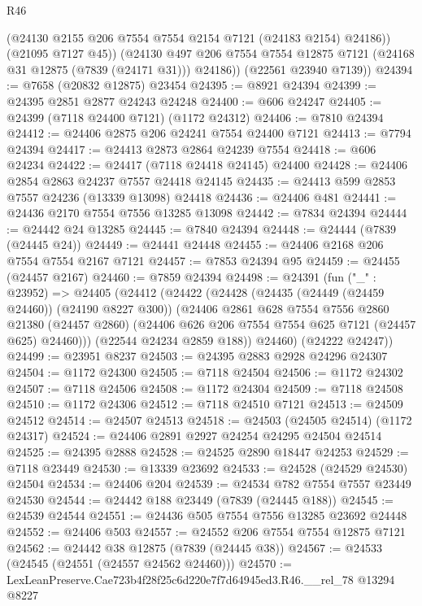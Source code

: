 \begin{lexlean}{R46}
\begin{coremodule}
            (@24130 @2155 @206 @7554 @7554 @2154 @7121 (@24183 @2154) @24186))
          (@21095 @7127 @45))
        (@24130 @497 @206 @7554 @7554 @12875 @7121 (@24168 @31 @12875 (@7839 (@24171 @31))) @24186))
      (@22561 @23940 @7139))
@24394 := @7658 (@20832 @12875) @23454
@24395 := @8921 @24394
@24399 := @24395 @2851 @2877 @24243 @24248
@24400 := @606 @24247
@24405 := @24399 (@7118 @24400 @7121) (@1172 @24312)
@24406 := @7810 @24394
@24412 := @24406 @2875 @206 @24241 @7554 @24400 @7121
@24413 := @7794 @24394
@24417 := @24413 @2873 @2864 @24239 @7554
@24418 := @606 @24234
@24422 := @24417 (@7118 @24418 @24145) @24400
@24428 := @24406 @2854 @2863 @24237 @7557 @24418 @24145
@24435 := @24413 @599 @2853 @7557 @24236 (@13339 @13098) @24418
@24436 := @24406 @481
@24441 := @24436 @2170 @7554 @7556 @13285 @13098
@24442 := @7834 @24394
@24444 := @24442 @24 @13285
@24445 := @7840 @24394
@24448 := @24444 (@7839 (@24445 @24))
@24449 := @24441 @24448
@24455 := @24406 @2168 @206 @7554 @7554 @2167 @7121
@24457 := @7853 @24394 @95
@24459 := @24455 (@24457 @2167)
@24460 := @7859 @24394
@24498 := @24391
    (fun ("_" : @23952) =>
    @24405
      (@24412
        (@24422
          (@24428
            (@24435 (@24449 (@24459 @24460)) (@24190 @8227 @300))
            (@24406
              @2861
              @628
              @7554
              @7556
              @2860
              @21380
              (@24457 @2860)
              (@24406 @626 @206 @7554 @7554 @625 @7121 (@24457 @625) @24460)))
          (@22544 @24234 @2859 @188))
        @24460)
      (@24222 @24247))
@24499 := @23951 @8237
@24503 := @24395 @2883 @2928 @24296 @24307
@24504 := @1172 @24300
@24505 := @7118 @24504
@24506 := @1172 @24302
@24507 := @7118 @24506
@24508 := @1172 @24304
@24509 := @7118 @24508
@24510 := @1172 @24306
@24512 := @7118 @24510 @7121
@24513 := @24509 @24512
@24514 := @24507 @24513
@24518 := @24503 (@24505 @24514) (@1172 @24317)
@24524 := @24406 @2891 @2927 @24254 @24295 @24504 @24514
@24525 := @24395 @2888
@24528 := @24525 @2890 @18447 @24253
@24529 := @7118 @23449
@24530 := @13339 @23692
@24533 := @24528 (@24529 @24530) @24504
@24534 := @24406 @204
@24539 := @24534 @782 @7554 @7557 @23449 @24530
@24544 := @24442 @188 @23449 (@7839 (@24445 @188))
@24545 := @24539 @24544
@24551 := @24436 @505 @7554 @7556 @13285 @23692 @24448
@24552 := @24406 @503
@24557 := @24552 @206 @7554 @7554 @12875 @7121
@24562 := @24442 @38 @12875 (@7839 (@24445 @38))
@24567 := @24533 (@24545 (@24551 (@24557 @24562 @24460)))
@24570 := LexLeanPreserve.Cae723b4f28f25c6d220e7f7d64945ed3.R46.__rel_78 @13294 @8227

\end{coremodule}
\end{lexlean}
